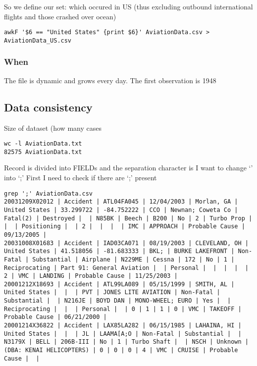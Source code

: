 \documentclass{article}
\begin{document}
So we define our set: which occured in US (thus excluding outbound
international flights and those crashed over ocean)

\begin{verbatim}
awkF '$6 == "United States" {print $6}' AviationData.csv > AviationData_US.csv
\end{verbatim}

\subsubsection{When}\label{when}

The file is dynamic and grows every day. The first observation is 1948

\subsection{Data consistency}\label{data-consistency}

Size of dataset (how many cases

\begin{verbatim}
wc -l AviationData.txt 
82575 AviationData.txt
\end{verbatim}

Record is divided into FIELDs and the separation character is \textbar{}
I want to change `\textbar{}' into `;' First I need to check if there
are `;' present

\begin{verbatim}
grep ';' AviationData.csv 
20031209X02012 | Accident | ATL04FA045 | 12/04/2003 | Morlan, GA | United States | 33.299722 | -84.752222 | CCO | Newnan; Coweta Co | Fatal(2) | Destroyed |  | N85BK | Beech | B200 | No | 2 | Turbo Prop |  |  | Positioning |  | 2 |  |  |  | IMC | APPROACH | Probable Cause | 09/13/2005 | 
20031008X01683 | Accident | IAD03CA071 | 08/19/2003 | CLEVELAND, OH | United States | 41.518056 | -81.683333 | BKL; | BURKE LAKEFRONT | Non-Fatal | Substantial | Airplane | N229ME | Cessna | 172 | No | 1 | Reciprocating | Part 91: General Aviation |  | Personal |  |  |  |  | 2 | VMC | LANDING | Probable Cause | 11/25/2003 | 
20001212X18693 | Accident | ATL99LA089 | 05/15/1999 | SMITH, AL | United States |  |  | PVT | JONES LITE AVIATION | Non-Fatal | Substantial |  | N216JE | BOYD DAN | MONO-WHEEL; EURO | Yes |  | Reciprocating |  |  | Personal |  | 0 | 1 | 1 | 0 | VMC | TAKEOFF | Probable Cause | 06/21/2000 | 
20001214X36822 | Accident | LAX85LA282 | 06/15/1985 | LAHAINA, HI | United States |  |  | JL | LAAMA[A;O | Non-Fatal | Substantial |  | N3179X | BELL | 206B-III | No | 1 | Turbo Shaft |  | NSCH | Unknown | (DBA: KENAI HELICOPTERS) | 0 | 0 | 0 | 4 | VMC | CRUISE | Probable Cause |  | 
\end{verbatim}
\end{document}
